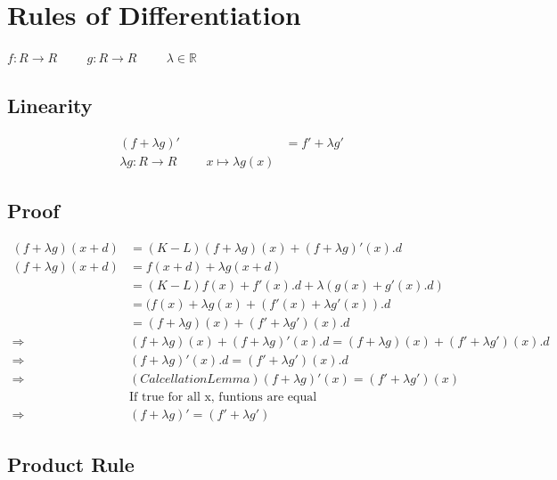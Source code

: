 \documentclass[a4paper,12pt]{article}
\begin{document}
\section*{Rules of Differentiation}
$f: R \to R \hspace{1cm} g: R \to R \hspace{1cm} \lambda \in \mathbb{R}$
\subsection*{Linearity}
\begin{align*}
(f + \lambda g)' &= f' + \lambda g' \\
\lambda g: R \to R \hspace{1cm} x \mapsto \lambda g(x)
\end{align*}
\subsection*{Proof}
\begin{align*}
(f + \lambda g)(x + d) &= (K-L) (f + \lambda g)(x) + (f + \lambda g)'(x).d \\
(f + \lambda g)(x+d) & = f(x+d) + \lambda g(x+d) \\
& = (K-L) f(x) + f'(x).d + \lambda(g(x) + g'(x).d) \\
& = (f(x) + \lambda g(x) + (f'(x) + \lambda g'(x)).d \\
& = (f+\lambda g)(x) + (f' + \lambda g')(x).d \\
\Rightarrow &(f+\lambda g)(x) + (f + \lambda g)'(x).d = (f + \lambda g)(x) + (f' +\lambda g')(x).d \\
\Rightarrow & (f+\lambda g)'(x).d = (f' + \lambda g')(x).d \\
\Rightarrow & (Calcellation Lemma) (f+\lambda g)'(x) = (f' + \lambda g')(x)\\
& \text{If true for all x, funtions are equal} \\
\Rightarrow &(f+\lambda g)' = (f'+\lambda g')
\end{align*}
\subsection*{Product Rule}
\begin{align*}

\end{align*}
\end{document}
